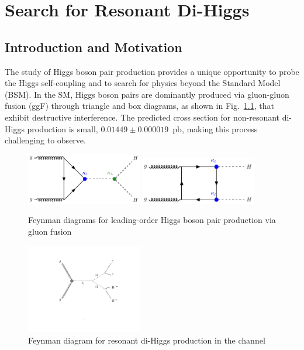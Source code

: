 \chapter{Search for Resonant Di-Higgs }
\label{ch:diHiggs_search}
\section{Introduction and Motivation}
The study of Higgs boson pair production provides a unique opportunity to probe the Higgs self-coupling and to search for physics
beyond the Standard Model (BSM). In the SM, Higgs boson pairs are dominantly produced via gluon-gluon fusion (ggF) through triangle
and box diagrams, as shown in Fig.~\ref{SMLO_ggHH_production}, that exhibit destructive interference.
The predicted cross section for non-resonant di-Higgs production is small, \(0.01449 \pm 0.000019\)~pb,
making this process challenging to observe.
\begin{figure}[!htbp]
    \begin{center}
        \includegraphics[width=0.45\textwidth]{figures/diHiggsSearches/fey_HH_Triangle.pdf} %
        \includegraphics[width=0.45\textwidth]{figures/diHiggsSearches/fey_HH_Box.pdf}
    \end{center}
    \caption{Feynman diagrams for leading-order Higgs boson pair production via gluon fusion}
    \label{SMLO_ggHH_production}
\end{figure}
\begin{figure}[!htbp]
    \begin{center}
        \includegraphics[width=0.45\textwidth]{figures/diHiggsSearches/fey_XHH_HHWWgg.pdf}
    \end{center}
    \caption{Feynman diagram for resonant di-Higgs production in the \HH channel}
    \label{XHHFeynmanDiagram}
\end{figure}


